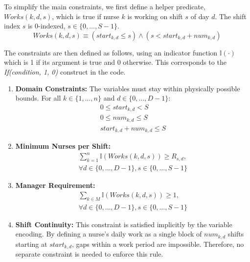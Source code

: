 \documentclass[sigconf, 10pt]{acmart}
\begin{document}
To simplify the main constraints, we first define a helper predicate, $Works(k, d, s)$, which is true if nurse $k$ is working on shift $s$ of day $d$. The shift index $s$ is 0-indexed, $s \in \{0, \dots, S-1\}$.
\begin{equation}
    Works(k, d, s) \equiv (start_{k,d} \le s) \land (s < start_{k,d} + num_{k,d})
\end{equation}

The constraints are then defined as follows, using an indicator function $\mathbb{I}(\cdot)$ which is 1 if its argument is true and 0 otherwise. This corresponds to the \textit{If(condition, 1, 0)} construct in the code.

\begin{enumerate}
    \item \textbf{Domain Constraints:} The variables must stay within physically possible bounds. For all $k \in \{1, \dots, n\}$ and $d \in \{0, \dots, D-1\}$:
    \begin{gather}
        0 \le start_{k,d} < S \\
        0 \le num_{k,d} \le S \\
        start_{k,d} + num_{k,d} \le S
    \end{gather}

    \item \textbf{Minimum Nurses per Shift:}
    \begin{equation}
    \begin{gathered}
        \sum_{k=1}^{n} \mathbb{I}(Works(k, d, s)) \ge R_{s,d}, \\
        \forall d \in \{0, \dots, D-1\}, s \in \{0, \dots, S-1\}
    \end{gathered}
    \end{equation}

    \item \textbf{Manager Requirement:}
    \begin{equation}
    \begin{gathered}
        \sum_{k \in M} \mathbb{I}(Works(k, d, s)) \ge 1, \\
        \forall d \in \{0, \dots, D-1\}, s \in \{0, \dots, S-1\}
    \end{gathered}
    \end{equation}

    \item \textbf{Shift Continuity:} This constraint is satisfied implicitly by the variable encoding. By defining a nurse's daily work as a single block of $num_{k,d}$ shifts starting at $start_{k,d}$, gaps within a work period are impossible. Therefore, no separate constraint is needed to enforce this rule.


\end{enumerate}
\end{document}
